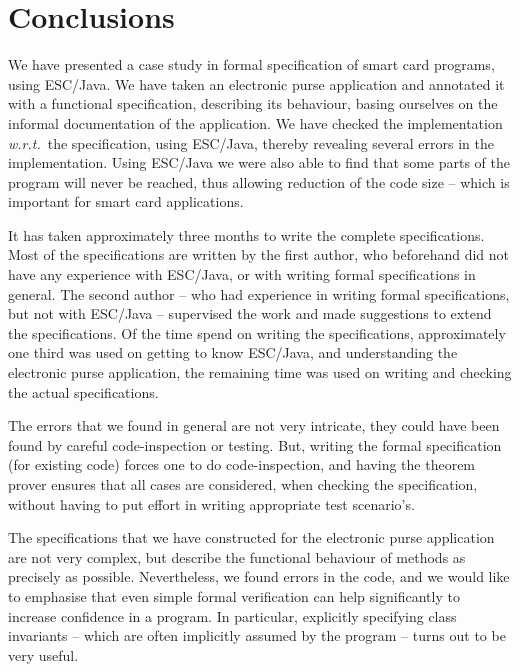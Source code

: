 \documentclass[a4paper]{llncs}
\begin{document}
\section{Conclusions}
\label{SectConcl}

We have presented a case study in formal specification of smart card
programs, using ESC/Java. We have taken an electronic purse
application and annotated it with a functional specification,
describing its behaviour, basing ourselves on the informal
documentation of the application. We have checked the implementation
\emph{w.r.t.}~the specification, using ESC/Java, thereby revealing
several errors in the implementation. Using ESC/Java we were also able 
to find that some parts of the program will never be reached, thus
allowing reduction of the code size -- which is important for smart
card applications. 

It has taken approximately three months to write the complete
specifications. Most of the specifications are written by the first
author, who beforehand did not have any experience with ESC/Java, or
with writing formal specifications in general. The second author --
who had experience in writing formal specifications, but not with
ESC/Java -- supervised the work and made suggestions to extend the
specifications. Of the time spend on writing the specifications,
approximately one third was used on getting to know ESC/Java, and
understanding the electronic purse application, the remaining time was
used on writing and checking the actual specifications.


The errors that we found in general are not very intricate, they could
have been found by careful code-inspection or testing. But, writing
the formal specification (for existing code) forces one to do
code-inspection, and having the theorem prover ensures that all
cases are considered, when checking the specification, without having
to put effort in writing appropriate test scenario's.

The specifications that we have constructed for the electronic purse
application are not very complex, but describe the functional
behaviour of methods as precisely as possible. Nevertheless, we found
errors in the code, and we would like to emphasise that even simple
formal verification can help significantly to increase confidence in a
program. In particular, explicitly specifying class invariants --
which are often implicitly assumed by the program -- turns
out to be very useful.
\end{document}
